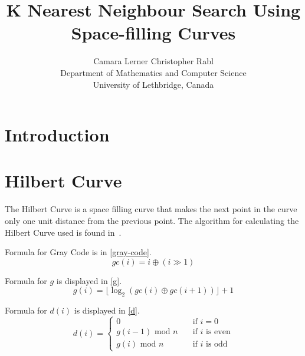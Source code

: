 \documentclass[10pt]{article}
\begin{document}
\title{K Nearest Neighbour Search Using Space-filling Curves}
\author{Camara Lerner \hspace{2cm} Christopher Rabl \\
  Department of Mathematics and Computer Science\\
  University of Lethbridge, Canada}

\maketitle

\begin{abstract}

\end{abstract}

\section{Introduction}


\section{Hilbert Curve}

The Hilbert Curve is a space filling curve that makes the next point in the curve only one unit distance from the previous point. The algorithm for calculating the Hilbert Curve used is found in~\cite{Hamilton:2006}.

\flushleft
Formula for Gray Code is in \ref{gray-code}.
\begin{equation}
  \label{gray-code}
  gc(i) = i \oplus \left( i \gg 1 \right) 
\end{equation}

Formula for $g$ is displayed in \ref{g}.
\begin{equation}
  \label{g}
  g(i) = \lfloor \log _{2} \left( gc(i) \oplus gc(i+1) \right) \rfloor + 1
\end{equation}


Formula for $d(i)$ is displayed in \ref{d}.
\begin{equation}
  \label{d}
  d(i) = 
    \begin{cases}
      0 & \quad \text{if $i = 0$}\\
      g(i - 1) \text{ mod } n & \quad \text{if $i$ is even} \\
      g(i) \text{ mod }  n & \quad \text{if $i$ is odd}
    \end{cases}
\end{equation}
\end{document}
